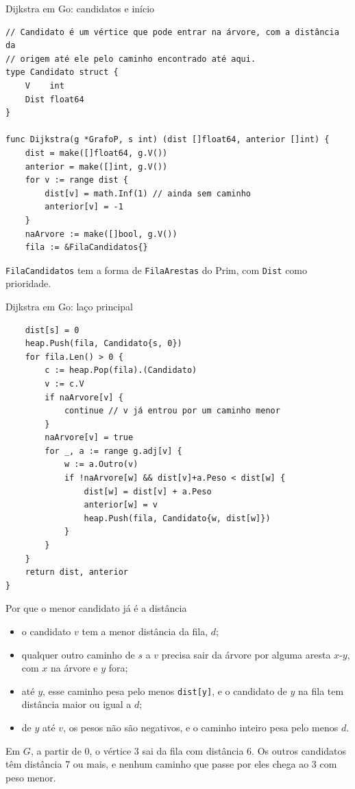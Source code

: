 \documentclass{beamer}
\begin{document}
\begin{frame}[fragile]{Dijkstra em Go: candidatos e início}
	\begin{verbatim}
// Candidato é um vértice que pode entrar na árvore, com a distância da
// origem até ele pelo caminho encontrado até aqui.
type Candidato struct {
    V    int
    Dist float64
}

func Dijkstra(g *GrafoP, s int) (dist []float64, anterior []int) {
    dist = make([]float64, g.V())
    anterior = make([]int, g.V())
    for v := range dist {
        dist[v] = math.Inf(1) // ainda sem caminho
        anterior[v] = -1
    }
    naArvore := make([]bool, g.V())
    fila := &FilaCandidatos{}
\end{verbatim}
	\footnotesize
	\texttt{FilaCandidatos} tem a forma de \texttt{FilaArestas} do Prim, com
	\texttt{Dist} como prioridade.
\end{frame}

\begin{frame}[fragile]{Dijkstra em Go: laço principal}
	\begin{verbatim}
    dist[s] = 0
    heap.Push(fila, Candidato{s, 0})
    for fila.Len() > 0 {
        c := heap.Pop(fila).(Candidato)
        v := c.V
        if naArvore[v] {
            continue // v já entrou por um caminho menor
        }
        naArvore[v] = true
        for _, a := range g.adj[v] {
            w := a.Outro(v)
            if !naArvore[w] && dist[v]+a.Peso < dist[w] {
                dist[w] = dist[v] + a.Peso
                anterior[w] = v
                heap.Push(fila, Candidato{w, dist[w]})
            }
        }
    }
    return dist, anterior
}
\end{verbatim}
\end{frame}

\begin{frame}{Por que o menor candidato já é a distância}
	\begin{itemize}
		\item o candidato $v$ tem a menor distância da fila, $d$;
		\item qualquer outro caminho de $s$ a $v$ precisa sair da árvore por alguma
		      aresta $x$-$y$, com $x$ na árvore e $y$ fora;
		\item até $y$, esse caminho pesa pelo menos \texttt{dist[y]}, e o candidato
		      de $y$ na fila tem distância maior ou igual a $d$;
		\item de $y$ até $v$, os pesos não são negativos, e o caminho inteiro pesa
		      pelo menos $d$.
	\end{itemize}
	\vspace{0.3cm}
	\footnotesize
	Em $G$, a partir de 0, o vértice 3 sai da fila com distância 6. Os outros
	candidatos têm distância 7 ou mais, e nenhum caminho que passe por eles chega
	ao 3 com peso menor.
\end{frame}
\end{document}
